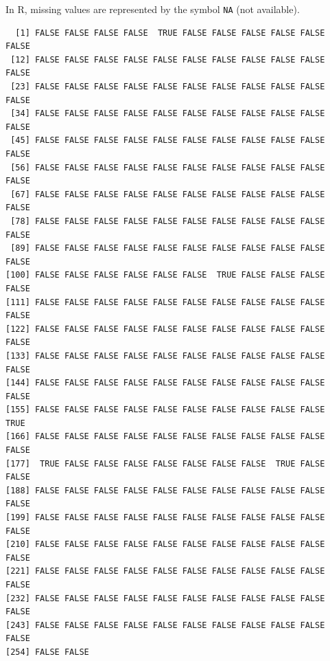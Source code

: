\documentclass[]{book}
\newenvironment{Shaded}{\begin{snugshade}}{\end{snugshade}}
\newcommand{\KeywordTok}[1]{\textcolor[rgb]{0.13,0.29,0.53}{\textbf{#1}}}
\newcommand{\OperatorTok}[1]{\textcolor[rgb]{0.81,0.36,0.00}{\textbf{#1}}}
\newcommand{\NormalTok}[1]{#1}
\theoremstyle{definition}
\theoremstyle{definition}
\theoremstyle{definition}
\theoremstyle{remark}
\begin{document}
In R, missing values are represented by the symbol \texttt{NA} (not
available).

\begin{Shaded}
\end{Shaded}

\begin{verbatim}
  [1] FALSE FALSE FALSE FALSE  TRUE FALSE FALSE FALSE FALSE FALSE FALSE
 [12] FALSE FALSE FALSE FALSE FALSE FALSE FALSE FALSE FALSE FALSE FALSE
 [23] FALSE FALSE FALSE FALSE FALSE FALSE FALSE FALSE FALSE FALSE FALSE
 [34] FALSE FALSE FALSE FALSE FALSE FALSE FALSE FALSE FALSE FALSE FALSE
 [45] FALSE FALSE FALSE FALSE FALSE FALSE FALSE FALSE FALSE FALSE FALSE
 [56] FALSE FALSE FALSE FALSE FALSE FALSE FALSE FALSE FALSE FALSE FALSE
 [67] FALSE FALSE FALSE FALSE FALSE FALSE FALSE FALSE FALSE FALSE FALSE
 [78] FALSE FALSE FALSE FALSE FALSE FALSE FALSE FALSE FALSE FALSE FALSE
 [89] FALSE FALSE FALSE FALSE FALSE FALSE FALSE FALSE FALSE FALSE FALSE
[100] FALSE FALSE FALSE FALSE FALSE FALSE  TRUE FALSE FALSE FALSE FALSE
[111] FALSE FALSE FALSE FALSE FALSE FALSE FALSE FALSE FALSE FALSE FALSE
[122] FALSE FALSE FALSE FALSE FALSE FALSE FALSE FALSE FALSE FALSE FALSE
[133] FALSE FALSE FALSE FALSE FALSE FALSE FALSE FALSE FALSE FALSE FALSE
[144] FALSE FALSE FALSE FALSE FALSE FALSE FALSE FALSE FALSE FALSE FALSE
[155] FALSE FALSE FALSE FALSE FALSE FALSE FALSE FALSE FALSE FALSE  TRUE
[166] FALSE FALSE FALSE FALSE FALSE FALSE FALSE FALSE FALSE FALSE FALSE
[177]  TRUE FALSE FALSE FALSE FALSE FALSE FALSE FALSE  TRUE FALSE FALSE
[188] FALSE FALSE FALSE FALSE FALSE FALSE FALSE FALSE FALSE FALSE FALSE
[199] FALSE FALSE FALSE FALSE FALSE FALSE FALSE FALSE FALSE FALSE FALSE
[210] FALSE FALSE FALSE FALSE FALSE FALSE FALSE FALSE FALSE FALSE FALSE
[221] FALSE FALSE FALSE FALSE FALSE FALSE FALSE FALSE FALSE FALSE FALSE
[232] FALSE FALSE FALSE FALSE FALSE FALSE FALSE FALSE FALSE FALSE FALSE
[243] FALSE FALSE FALSE FALSE FALSE FALSE FALSE FALSE FALSE FALSE FALSE
[254] FALSE FALSE
\end{verbatim}

\begin{Shaded}
\end{Shaded}
\end{document}

